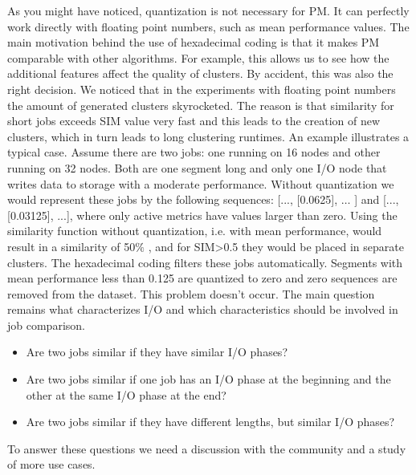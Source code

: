 \documentclass[]{llncs}
\begin{document}
{{{{As you might have noticed, quantization is not necessary for PM.
It can perfectly work directly with floating point numbers, such as mean performance values.
The main motivation behind the use of hexadecimal coding is that it makes PM comparable with other algorithms.
For example, this allows us to see how the additional features affect the quality of clusters.
By accident, this was also the right decision.
We noticed that in the experiments with floating point numbers the amount of generated clusters skyrocketed.
The reason is that similarity for short jobs exceeds SIM value very fast and this leads to the creation of new clusters, which in turn leads to long clustering runtimes.
An example illustrates a typical case.
Assume there are two jobs: one running on 16 nodes and other running on 32 nodes.
Both are one segment long and only one I/O node that writes data to storage with a moderate performance.
Without quantization we would represent these jobs by the following sequences:  [..., [0.0625], $ \ldots $ ] and [..., [0.03125], ...], where only active metrics have values larger than zero.
Using the similarity function without quantization, i.e. with mean performance, would result in a similarity of 50$\%$ , and for SIM>0.5 they would be placed in separate clusters.
The hexadecimal coding filters these jobs automatically. Segments with mean performance less than 0.125 are quantized to zero and zero sequences are removed from the dataset. This problem doesn’t occur.
The main question remains what characterizes I/O and which characteristics should be involved in job comparison. 

\begin{itemize}
	\item Are two jobs similar if they have similar I/O phases? 
	\item Are two jobs similar if one job has an I/O phase at the beginning and the other at the same I/O phase at the end?
	\item Are two jobs similar if they have different lengths, but similar I/O phases?
\end{itemize}

To answer these questions we need a discussion with the community and a study of more use cases.
}}}}
\end{document}
